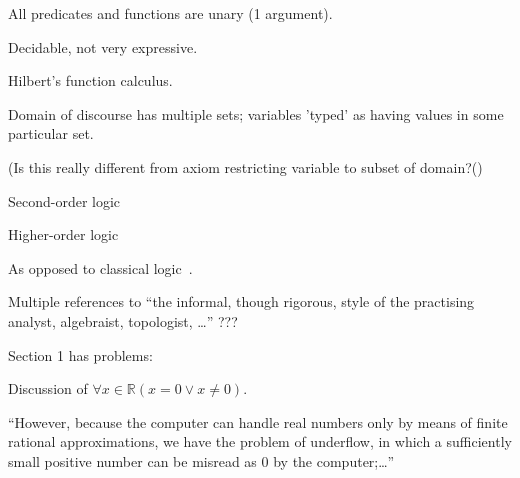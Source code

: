 All predicates and functions are unary 
(1 argument).~\cite{wiki:Monadic_predicate_calculus}

Decidable, not very expressive.

\label{sec:Many_sorted_first_order_models}

Hilbert's function calculus.~\cite{sep:logic_firstorder_emergence}

Domain of discourse has multiple sets;
variables 'typed' as having values in some particular 
set.~\cite{sep:modeltheory_fo}

(Is this really different from
axiom restricting variable to subset of domain?()


\label{sec:Second_order_logic}

Second-order logic~\cite{wiki:Second_order_logic,
wiki:Second_order_propositional_logic}

\label{sec:Higher_order_logic}

Higher-order logic~\cite{wiki:Higher_order_logic}


\setcounter{currentlevel}{\value{baseSectionLevel}}
\label{sec:Constructivism}

\cite{Feferman:2000,Diez:2002,sep:mathematics_constructive,
wiki:Constructivism_philosophy_of_mathematics}

As opposed to classical logic~\cite{wiki:Classical_logic}.

\label{sec:Constructivism_SEP}
\cite{sep:mathematics_constructive}

Multiple references to ``the informal, though rigorous, 
style of the practising analyst, algebraist, topologist, \ldots''
???

Section 1 has problems:

Discussion of
$ \forall x \in \mathbb{R} (x = 0 \vee x \ne 0)$.

``However, because the computer can handle real numbers 
only by means of finite rational approximations, 
we have the problem of underflow, 
in which a sufficiently small positive number can be misread as 0 
by the computer;\ldots''

